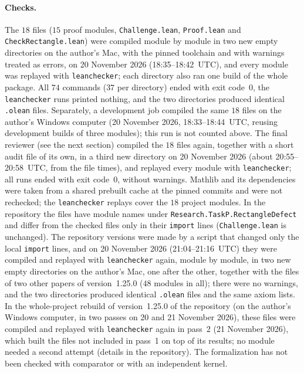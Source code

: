 \documentclass[11pt]{article}
\theoremstyle{definition}
\theoremstyle{remark}
\newcommand{\repoversion}{1.25.0}
\begin{document}
{\paragraph{Checks.}
The $18$ files ($15$ proof modules, \texttt{Challenge.lean},
\texttt{Proof.lean} and \texttt{CheckRectangle.lean}) were compiled module by
module in two new empty directories on the author's Mac, with the pinned
toolchain and with warnings treated as errors, on 20 November 2026
(18:35--18:42~UTC), and every module was replayed with \texttt{leanchecker};
each directory also ran one build of the whole package. All $74$ commands
($37$ per directory) ended with exit code~$0$, the \texttt{leanchecker} runs
printed nothing, and the two directories produced identical \texttt{.olean}
files. Separately, a development job compiled the same $18$ files on the author's
Windows computer (20 November 2026, 18:33--18:44~UTC, reusing development
builds of three modules); this run is not counted above. The final reviewer
(see the next section) compiled the $18$ files again, together with a short
audit file of its own, in a third new directory on 20 November 2026 (about
20:55--20:58~UTC, from the file times), and replayed every module with
\texttt{leanchecker}; all runs ended with exit code~$0$, without warnings.
Mathlib and its dependencies were taken from a shared prebuilt cache at the
pinned commits and were not rechecked; the \texttt{leanchecker} replays cover
the $18$ project modules. In the repository the files have module names under
\texttt{Research.TaskP.RectangleDefect} and differ from the checked files only
in their \texttt{import} lines (\texttt{Challenge.lean} is unchanged).
The repository versions were made by a script that changed only the local \texttt{import} lines, and on 20 November 2026 (21:04--21:16~UTC) they were compiled and replayed with \texttt{leanchecker} again, module by module, in two new empty directories on the author's Mac, one after the other, together with the files of two other papers of version~\repoversion{} ($48$ modules in all); there were no warnings, and the two directories produced identical \texttt{.olean} files and the same axiom lists. In the whole-project rebuild of version~\repoversion{} of the repository (on the author's Windows computer, in two passes on 20 and 21 November 2026), these files were compiled and replayed with \texttt{leanchecker} again in pass~2 (21 November 2026), which built the files not included in pass~1 on top of its results; no module needed a second attempt (details in the repository). The formalization has not been checked with
comparator or with an independent kernel.

\par}
\end{document}
